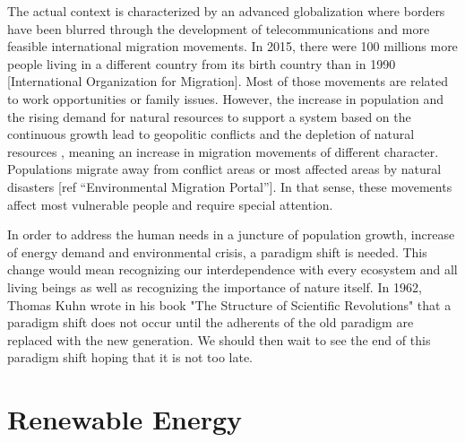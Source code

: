 The actual context is characterized by an advanced globalization where borders have been blurred through the development of telecommunications and  more feasible international migration movements. In 2015, there were 100 millions more people living in a different country from its birth country than in 1990 \cite*{IOM} [International Organization for Migration]. Most of those movements are related to work opportunities or family issues. However, the increase in population and the rising demand for natural resources to support a system based on the continuous growth lead to geopolitic conflicts and the depletion of natural resources \cite*{Rosa2012,commoner1991}, meaning an increase in migration movements of different character. Populations migrate away from conflict areas or most affected areas by natural disasters \cite*{IOM}[ref ``Environmental Migration Portal'']. In that sense, these movements affect most vulnerable people and require special attention.

In order to address the human needs in a juncture of population growth, increase of energy demand and environmental crisis, a paradigm shift is needed. This change would mean recognizing our interdependence with every ecosystem and all living beings as well as recognizing the importance of nature itself. In 1962, Thomas Kuhn wrote in his book  "The Structure of Scientific Revolutions" that a paradigm shift does not occur until the adherents of the old paradigm are replaced with the new generation. We should then wait to see the end of this paradigm shift hoping that it is not too late.

\section{Renewable Energy}


 
